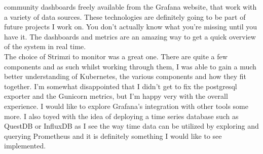 community dashboards freely available from the Grafana website, that work with a variety of data sources. 
\bigbreak
These technologies are definitely going to be part of future projects I work on. You don't actually know what you're missing until you have it.
The dashboards and metrics are an amazing way to get a quick overview of the system in real time.\\
The choice of Strimzi to monitor was a great one. There are quite a few components and as such whilst working through them, I was able to
gain a much better understanding of Kubernetes, the various components and how they fit together. I'm somewhat disappointed that I didn't
get to fix the postgresql exporter and the Gunicorn metrics, but I'm happy very with the overall experience.
\bigbreak
I would like to explore Grafana's integration with other tools some more. I also toyed with the idea of deploying a time series database
such as QuestDB or InfluxDB as I see the way time data can be utilized by exploring and querying Prometheus and it is definitely something 
I would like to see implemented.






